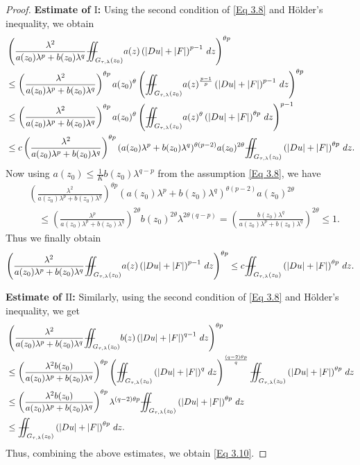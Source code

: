 \documentclass[11pt,oneside, english,reqno,twoside a4paper]{amsart}
\theoremstyle{definition}
\numberwithin{theorem}{section}
\numberwithin{equation}{section}
\newcommand{\iintss}{{\int\hspace{-0.28cm}\int}}
\newcommand{ \miints }{{\iintss\hspace{-0.56cm} -\hspace{-0.15cm}-}}
\newcommand{\miint}[1]{{\miints_{\hspace{-0.13cm}#1}}}
\begin{document}
\begin{proof}
\noindent\textbf{Estimate of $\mathrm{I}$:} Using the second condition of \eqref{Eq 3.8} and H\"{o}lder's inequality, we obtain
\begin{align*}
    &\left(\frac{\lambda^2}{a(z_0)\lambda^p+b(z_0)\lambda^q}\miint{G_{\tau, \lambda}(z_0)}a(z)\left(|Du|+|F|\right)^{p-1}\,dz\right)^{\theta p}\\
    &\leq \left(\frac{\lambda^2}{a(z_0)\lambda^p+b(z_0)\lambda^q}\right)^{\theta p}a(z_0)^{\theta}\left(\miint{G_{\tau, \lambda}(z_0)}a(z)^{\frac{p-1}{p}}\left(|Du|+|F|\right)^{p-1}\,dz\right)^{\theta p}\\
    &\leq \left(\frac{\lambda^2}{a(z_0)\lambda^p+b(z_0)\lambda^q}\right)^{\theta p}a(z_0)^{\theta}\left(\miint{G_{\tau, \lambda}(z_0)}a(z)^\theta \left(|Du|+|F|\right)^{\theta p}\,dz\right)^{p-1}\\
    &\leq c\left(\frac{\lambda^2}{a(z_0)\lambda^p+b(z_0)\lambda^q}\right)^{\theta p}(a(z_0)\lambda^p+b(z_0)\lambda^q)^{\theta (p-2)}a(z_0)^{2\theta} \miint{G_{\tau, \lambda}(z_0)} \left(|Du|+|F|\right)^{\theta p}\,dz.
\end{align*}
Now using $a(z_0)\leq \frac{1}{K} b(z_0)\lambda^{q-p}$ from the assumption \eqref{Eq 3.8}, we have
\begin{align*}
 &\left(\frac{\lambda^2}{a(z_0)\lambda^p+b(z_0)\lambda^q}\right)^{\theta p}(a(z_0)\lambda^p+b(z_0)\lambda^q)^{\theta (p-2)}a(z_0)^{2\theta}\\
 &\quad \leq \left(\frac{\lambda^p}{a(z_0)\lambda^p+b(z_0)\lambda^q}\right)^{2\theta}b(z_0)^{2\theta}\lambda^{2\theta(q-p)}=\left(\frac{b(z_0)\lambda^{q}}{a(z_0)\lambda^p+b(z_0)\lambda^q}\right)^{2\theta} \leq 1.
\end{align*}
Thus we finally obtain
\begin{align*}
\left(\frac{\lambda^2}{a(z_0)\lambda^p+b(z_0)\lambda^q}\miint{G_{\tau, \lambda}(z_0)}a(z)\left(|Du|+|F|\right)^{p-1}\,dz\right)^{\theta p} \leq c \miint{G_{\tau, \lambda}(z_0)} \left(|Du|+|F|\right)^{\theta p}\,dz.    
\end{align*}

\noindent\textbf{Estimate of $\mathrm{II}$:} Similarly, using the second condition of \eqref{Eq 3.8} and H\"{o}lder's inequality, we get
\begin{align*}
&\left(\frac{\lambda^2}{a(z_0)\lambda^p+b(z_0)\lambda^q}\miint{G_{\tau, \lambda}(z_0)}b(z)\left(|Du|+|F|\right)^{q-1}\,dz\right)^{\theta p}\\
&\leq \left(\frac{\lambda^2 b(z_0)}{a(z_0)\lambda^p+b(z_0)\lambda^q}\right)^{\theta p}\left(\miint{G_{\tau, \lambda}(z_0)}\left(|Du|+|F|\right)^q\, dz\right)^{\frac{(q-2)\theta p}{q}} \miint{G_{\tau, \lambda}(z_0)}\left(|Du|+|F|\right)^{\theta p}\, dz\\
&\leq \left(\frac{\lambda^2 b(z_0)}{a(z_0)\lambda^p+b(z_0)\lambda^q}\right)^{\theta p} \lambda^{(q-2)\theta p} \miint{G_{\tau, \lambda}(z_0)}\left(|Du|+|F|\right)^{\theta p}\, dz\\
&\leq \miint{G_{\tau, \lambda}(z_0)}\left(|Du|+|F|\right)^{\theta p}\, dz.
\end{align*}
Thus, combining the above estimates, we obtain \eqref{Eq 3.10}.


\end{proof}
\end{document}
